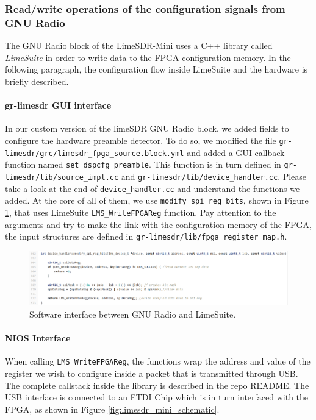 \subsubsection{Read/write operations of the configuration signals from GNU Radio}
The GNU Radio block of the LimeSDR-Mini uses a C++ library called \textit{LimeSuite} in order to write data to the FPGA configuration memory. In the following paragraph, the configuration flow inside LimeSuite and the hardware is briefly described.

\begin{sloppypar}
\paragraph{gr-limesdr GUI interface}
In our custom version of the limeSDR GNU Radio block, we added fields to configure the hardware preamble detector. To do so, we modified the file \texttt{gr-limesdr/grc/limesdr\_fpga\_source.block.yml} and added a GUI callback function named \texttt{set\_dspcfg\_preamble}. This function is in turn defined in \texttt{gr-limesdr/lib/source\_impl.cc} and \texttt{gr-limesdr/lib/device\_handler.cc}. Please take a look at the end of \texttt{device\_handler.cc} and understand the functions we added. At the core of all of them, we use \texttt{modify\_spi\_reg\_bits}, shown in Figure \ref{fig:modify_spi_reg_bits}, that uses LimeSuite \texttt{LMS\_WriteFPGAReg} function. Pay attention to the arguments and try to make the link with the configuration memory of the FPGA, the input structures are defined in \texttt{gr-limesdr/lib/fpga\_register\_map.h}.
\end{sloppypar}

\begin{figure}[!h]
    \centering
    \includegraphics[width=\linewidth]{figures/grlimesdr_write_fpgacfg.PNG}
    \caption{Software interface between GNU Radio and LimeSuite.}
    \label{fig:modify_spi_reg_bits}
\end{figure}

\paragraph{NIOS Interface}
When calling \texttt{LMS\_WriteFPGAReg}, the functions wrap the address and value of the register we wish to configure inside a packet that is transmitted through USB. The complete callstack inside the library is described in the repo README. The USB interface is connected to an FTDI Chip which is in turn interfaced with the FPGA, as shown in Figure \ref{fig:limesdr_mini_schematic}.


